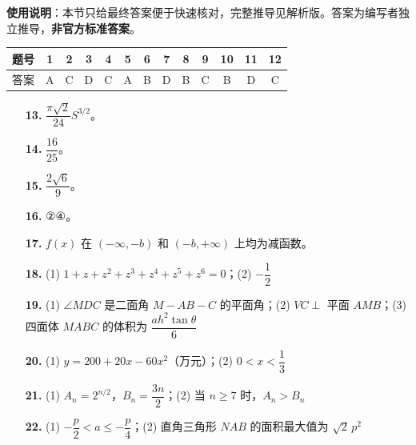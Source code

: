 
\begin{gknotice}
\textbf{使用说明}：本节只给最终答案便于快速核对，完整推导见解析版。答案为编写者独立推导，\textbf{非官方标准答案}。
\end{gknotice}

\begin{center}\begin{tabular}{ccccccccccccc}
\toprule
题号 & 1 & 2 & 3 & 4 & 5 & 6 & 7 & 8 & 9 & 10 & 11 & 12 \\
\midrule
答案 & A & C & D & C & A & B & D & B & C & B & D & C \\
\bottomrule
\end{tabular}\end{center}

\begin{itemize}[leftmargin=2.6em]
  \item[\textbf{13.}] $\dfrac{\pi\sqrt2}{24}S^{3/2}$。
  \item[\textbf{14.}] $\dfrac{16}{25}$。
  \item[\textbf{15.}] $\dfrac{2\sqrt6}{9}$。
  \item[\textbf{16.}] ②④。
\end{itemize}

\begin{itemize}[leftmargin=2.6em]
  \item[\textbf{17.}] $f(x)$ 在 $(-\infty,-b)$ 和 $(-b,+\infty)$ 上均为减函数。
  \item[\textbf{18.}] (1) $1+z+z^2+z^3+z^4+z^5+z^6=0$；(2) $-\dfrac12$
  \item[\textbf{19.}] (1) $\angle MDC$ 是二面角 $M-AB-C$ 的平面角；(2) $VC\perp$ 平面 $AMB$；(3) 四面体 $MABC$ 的体积为 $\dfrac{ah^2\tan\theta}{6}$
  \item[\textbf{20.}] (1) $y=200+20x-60x^2$（万元）；(2) $0<x<\dfrac13$
  \item[\textbf{21.}] (1) $A_n=2^{n/2}$，$B_n=\dfrac{3n}{2}$；(2) 当 $n\ge7$ 时，$A_n>B_n$
  \item[\textbf{22.}] (1) $-\dfrac p2<a\le-\dfrac p4$；(2) 直角三角形 $NAB$ 的面积最大值为 $\sqrt2\,p^2$
\end{itemize}
